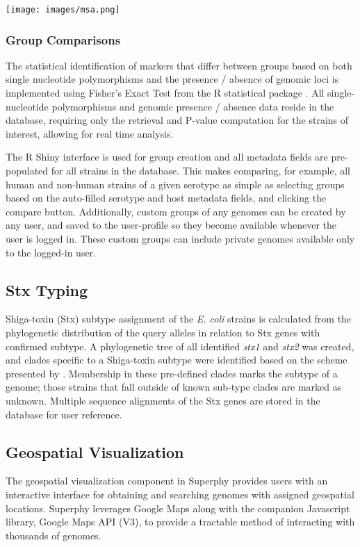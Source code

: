 \documentclass[doublespacing, linenumbers]{bmcart}
\begin{document}
 \texttt{[image: images/msa.png]}

\subsubsection{Group Comparisons}
The statistical identification of markers that differ between groups based on both single nucleotide polymorphisms and the presence / absence of genomic loci is implemented using Fisher’s Exact Test from the R statistical package \cite{r_foundation_for_statistical_computing_r:_2005}. All single-nucleotide polymorphisms and genomic presence / absence data reside in the database, requiring only the retrieval and P-value computation for the strains of interest, allowing for real time analysis.

The R Shiny interface is used for group creation and all metadata fields are pre-populated for all strains in the database. This makes comparing, for example, all human and non-human strains of a given serotype as simple as selecting groups based on the auto-filled serotype and host metadata fields, and clicking the compare button. Additionally, custom groups of any genomes can be created by any user, and saved to the user-profile so they become available whenever the user is logged in. These custom groups can include private genomes available only to the logged-in user.

\subsection{Stx Typing}
Shiga-toxin (Stx) subtype assignment of the \textit{E. coli} strains is calculated from the phylogenetic distribution of the query alleles in relation to Stx genes with confirmed subtype. A phylogenetic tree of all identified \textit{stx1} and \textit{stx2} was created, and clades specific to a Shiga-toxin subtype were identified based on the scheme presented by \cite{scheutz_multicenter_2012}. Membership in these pre-defined clades marks the subtype of a genome; those strains that fall outside of known sub-type clades are marked as unknown. Multiple sequence alignments of the Stx genes are stored in the database for user reference.

\subsection{Geospatial Visualization}
The geospatial visualization component in Superphy provides users with an interactive interface for obtaining and searching genomes with assigned geospatial locations. Superphy leverages Google Maps along with the companion Javascript library, Google Maps API (V3), to provide a tractable method of interacting with thousands of genomes. 
\end{document}
